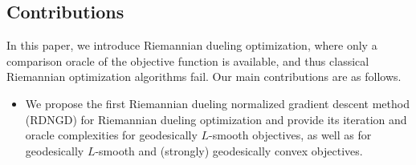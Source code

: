 \documentclass{article}
\theoremstyle{plain}
\theoremstyle{definition}
\theoremstyle{remark}
\begin{document}
\subsection{Contributions}
In this paper, we introduce Riemannian dueling optimization, where only a comparison oracle of the objective function is available, and thus classical Riemannian optimization algorithms fail. Our main contributions are as follows.
\begin{itemize}[leftmargin=*]
    \item We propose the first Riemannian dueling normalized gradient descent method (RDNGD) for Riemannian dueling optimization and provide its iteration and oracle complexities for geodesically $L$-smooth objectives, as well as for geodesically $L$-smooth and (strongly) geodesically convex objectives.

\end{itemize}
\end{document}

